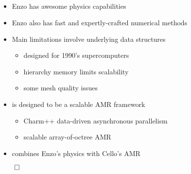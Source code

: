 \NEWSEC

\subsection{\ssIntroSummary}


\begin{frame}[fragile,label=ss-intro-summary] 
\secframetitle{\ssIntroSummary}

\begin{itemize}
\item Enzo has awesome physics capabilities
\item Enzo also has fast and expertly-crafted numerical methods
\item Main limitations involve underlying data structures
  \begin{itemize}
  \item designed for 1990's supercomputers
  \item hierarchy memory limits scalability
  \item some mesh quality issues
  \end{itemize}
\item {} is designed to be a scalable AMR framework
  \begin{itemize}
  \item Charm++ data-driven asynchronous parallelism
  \item scalable array-of-octree AMR
  \end{itemize}
\item {} combines Enzo's physics with Cello's AMR
\end{itemize}
\vfill
\centerline{$\qed$}
\end{frame}


